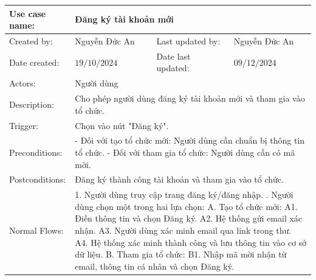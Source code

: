 \begin{table}[H]
	\centering
	\begin{tabular}{|l|l|l|l|} 
		\hline Use case name: & \multicolumn{3}{|l|}{Đăng ký tài khoản mới} \\ 
		\hline Created by: & Nguyễn Đức An & Last updated by: & Nguyễn Đức An \\ 
		\hline Date created: & $19 / 10 / 2024$ & Date last updated: & $09 / 12 / 2024$\\ 
		\hline Actors: & \multicolumn{3}{|l|}{Người dùng} \\ 
		\hline Description: & \multicolumn{3}{|p{12cm}|}{Cho phép người dùng đăng ký tài khoản mới và tham gia vào tổ chức.} \\ 
		\hline Trigger: & \multicolumn{3}{|p{12cm}|}{Chọn vào nút "Đăng ký".} \\ 
		\hline Preconditions: & \multicolumn{3}{|p{12cm}|}{
			- Đối với tạo tổ chức mới: Người dùng cần chuẩn bị thông tin tổ chức. \newline
			- Đối với tham gia tổ chức: Người dùng cần có mã mời.
		} \\ 
		\hline Postconditions: & \multicolumn{3}{|p{12cm}|}{Đăng ký thành công tài khoản và tham gia vào tổ chức.} \\ 
		\hline Normal Flows: & \multicolumn{3}{|p{12cm}|}{
            1. Người dùng truy cập trang đăng ký/đăng nhập. \newline
            2. Người dùng chọn một trong hai lựa chọn: \newline
            \hspace{0.5cm}A. Tạo tổ chức mới: \newline
                \hspace{1cm}A1. Điền thông tin và chọn Đăng ký. \newline
                \hspace{1cm}A2. Hệ thống gửi email xác nhận. \newline
                \hspace{1cm}A3. Người dùng xác minh email qua link trong thư. \newline
                \hspace{1cm}A4. Hệ thống xác minh thành công và lưu thông tin vào cơ sở dữ liệu. \newline
            \hspace{0.5cm}B. Tham gia tổ chức: \newline
                \hspace{1cm}B1. Nhập mã mời nhận từ email, thông tin cá nhân và chọn Đăng ký. \newline
}
\end{tabular}
\end{table}
